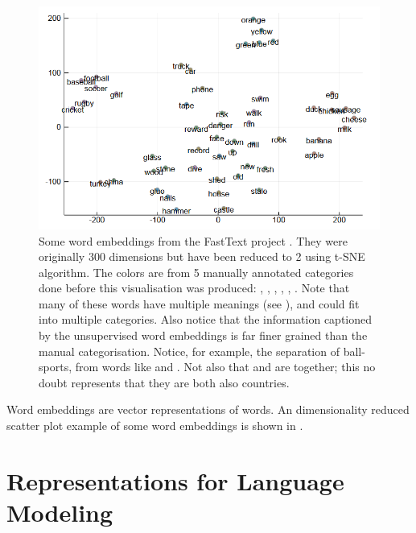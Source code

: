\documentclass[parskip]{komatufte}
\begin{document}
\begin{figure}
	
	\caption{Some word embeddings from the FastText project \parencite{bojanowski2016enriching}.
	They were originally 300 dimensions but have been reduced to 2 using t-SNE  algorithm.
	The colors are from 5 manually annotated categories done before this visualisation was produced:
	, , , , , .
	Note that many of these words have multiple meanings (see ), and could fit into multiple categories.
	Also notice that the information captioned by the unsupervised word embeddings is far finer grained than the manual categorisation.
	Notice, for example, the separation of ball-sports, from words like  and .
	Not also that  and  are together; this no doubt represents that they are both also countries.}

	\label{fig:wordvectors}
	\includegraphics[width=\textwidth]{figs/chapterwordrepr/wordembvisual}
\end{figure}


Word embeddings are vector representations of words.
An dimensionality reduced scatter plot example of some word embeddings is shown in  .


\section{Representations for Language Modeling}

\end{document}
